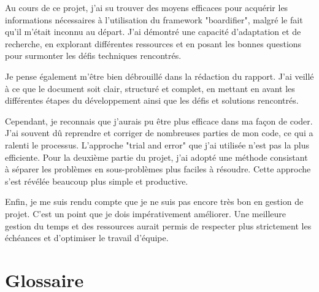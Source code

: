 Au cours de ce projet, j'ai su trouver des moyens efficaces pour acquérir les informations nécessaires à l'utilisation du framework "boardifier", malgré le fait qu'il m'était inconnu au départ. J'ai démontré une capacité d'adaptation et de recherche, en explorant différentes ressources et en posant les bonnes questions pour surmonter les défis techniques rencontrés.

Je pense également m'être bien débrouillé dans la rédaction du rapport. J'ai veillé à ce que le document soit clair, structuré et complet, en mettant en avant les différentes étapes du développement ainsi que les défis et solutions rencontrés.

Cependant, je reconnais que j'aurais pu être plus efficace dans ma façon de coder. J'ai souvent dû reprendre et corriger de nombreuses parties de mon code, ce qui a ralenti le processus. L'approche "trial and error" que j'ai utilisée n'est pas la plus efficiente. Pour la deuxième partie du projet, j'ai adopté une méthode consistant à séparer les problèmes en sous-problèmes plus faciles à résoudre. Cette approche s'est révélée beaucoup plus simple et productive.

Enfin, je me suis rendu compte que je ne suis pas encore très bon en gestion de projet. C'est un point que je dois impérativement améliorer. Une meilleure gestion du temps et des ressources aurait permis de respecter plus strictement les échéances et d'optimiser le travail d'équipe.

\chapter{Glossaire}


